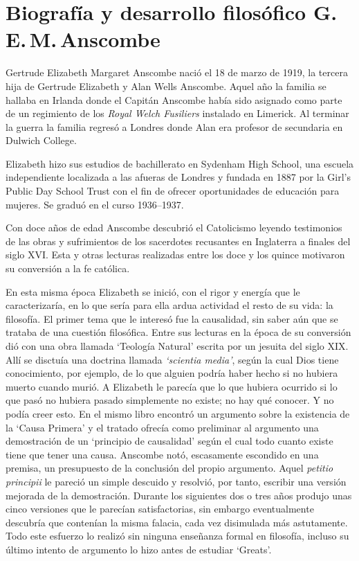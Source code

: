 \section{Biografía y desarrollo filosófico G.\,E.\,M.\,Anscombe}

Gertrude Elizabeth Margaret Anscombe nació el 18 de marzo de 1919, la tercera hija de Gertrude Elizabeth y Alan Wells Anscombe. Aquel año la familia se hallaba en Irlanda donde el Capitán Anscombe había sido asignado como parte de un regimiento de los \emph{Royal Welch Fusiliers} instalado en Limerick. Al terminar la guerra la familia regresó a Londres donde Alan era profesor de secundaria en Dulwich College.\autocite[Cf.~][31]{teichman2002fellows}

Elizabeth hizo sus estudios de bachillerato en Sydenham High School, una escuela independiente localizada a las afueras de Londres y fundada en 1887 por la Girl's Public Day School Trust con el fin de ofrecer oportunidades de educación para mujeres. Se graduó en el curso 1936--1937.

Con doce años de edad Anscombe descubrió el Catolicismo leyendo testimonios de las obras y sufrimientos de los sacerdotes recusantes en Inglaterra a finales del siglo XVI. Esta y otras lecturas realizadas entre los doce y los quince motivaron su conversión a la fe católica.\autocite[Cf.~][33]{teichman2002fellows}

En esta misma época Elizabeth se inició, con el rigor y energía que le caracterizaría, en lo que sería para ella ardua actividad el resto de su vida: la filosofía. El primer tema que le interesó fue la causalidad, sin saber aún que se trataba de una cuestión filosófica. Entre sus lecturas en la época de su conversión dió con una obra llamada `Teología Natural' escrita por un jesuita del siglo XIX. Allí se disctuía una doctrina llamada \emph{`scientia media'}, según la cual Dios tiene conocimiento, por ejemplo, de lo que alguien podría haber hecho si no hubiera muerto cuando murió. A Elizabeth le parecía que lo que hubiera ocurrido si lo que pasó no hubiera pasado simplemente no existe; no hay qué conocer. Y no podía creer esto. En el mismo libro encontró un argumento sobre la existencia de la `Causa Primera' y el tratado ofrecía como preliminar al argumento una demostración de un `principio de causalidad' según el cual todo cuanto existe tiene que tener una causa. Anscombe notó, escasamente escondido en una premisa, un presupuesto de la conclusión del propio argumento. Aquel \emph{petitio principii} le pareció un simple descuido y resolvió, por tanto, escribir una versión mejorada de la demostración. Durante los siguientes dos o tres años produjo unas cinco versiones que le parecían satisfactorias, sin embargo eventualmente descubría que contenían la misma falacia, cada vez disimulada más astutamente. Todo este esfuerzo lo realizó sin ninguna enseñanza formal en filosofía, incluso su último intento de argumento lo hizo antes de estudiar `Greats'.\autocite[Cf.~][vii]{anscombe1981metaphysics}

